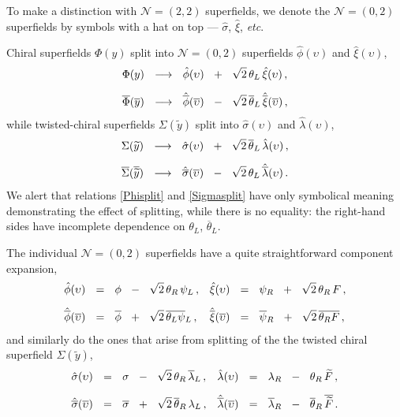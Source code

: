 \documentclass[epsfig,12pt]{article}
\newcommand{\ntwot}{${\mathcal N}= \left(2,2\right) $ }
\newcommand{\ntwoo}{${\mathcal N}= \left(0,2\right) $ }
\newcommand{\wt}{\widetilde}
\newcommand{\ov}{\overline}
\newcommand{\hphi}{\hat\phi{}}
\newcommand{\hbphi}{\hat{\ov\phi}{}}
\newcommand{\hxi}{\hat\xi{}}
\newcommand{\hbxi}{\hat{\ov\xi}{}}
\newcommand{\hsigma}{\hat\sigma{}}
\newcommand{\hbsigma}{\hat{\ov\sigma}{}}
\newcommand{\hlambda}{\hat\lambda{}}
\newcommand{\hblambda}{\hat{\ov\lambda}{}}
\begin{document}
	To make a distinction with \ntwot superfields, we denote the \ntwoo superfields
	by symbols with a hat on top --- $ \hsigma $, $ \hxi $, {\it etc}.

	Chiral superfields $ \Phi(y) $ split into \ntwoo superfields 
	$ \hphi(\upsilon) $ and $ \hxi(\upsilon) $,
\begin{align}
%
\notag
	\Phi(y) &    ~~\longrightarrow~~    \hphi(\upsilon)  ~~+~~  \sqrt{2}\,\theta_L\,\hxi(\upsilon)\,,
	\\[2mm]
%
\label{Phisplit}
	\ov\Phi(\ov y) &    ~~\longrightarrow~~    \hbphi(\ov\upsilon)  ~~-~~  \sqrt{2}\,\ov\theta{}_L\,\hbxi(\ov\upsilon)\,,
\end{align}
	while twisted-chiral superfields $ \Sigma(\wt y) $ split into 
	$ \hsigma(\upsilon) $ and $ \hlambda(\upsilon) $,
\begin{align}
%
\notag
	\Sigma(\wt y) &    ~~\longrightarrow~~    \hsigma(\upsilon)  ~~+~~  \sqrt{2}\,\ov\theta{}_L\,\hlambda(\upsilon)\,,
	\\[2mm]
%
\label{Sigmasplit}
	\ov\Sigma(\ov{\wt y}) &    ~~\longrightarrow~~    \hbsigma(\ov\upsilon)  ~~-~~  \sqrt{2}\,\theta_L\,\hblambda(\upsilon)\,.
\end{align}
	We alert that relations \eqref{Phisplit} and \eqref{Sigmasplit} have only symbolical meaning demonstrating
	the effect of splitting, while there is no equality:
	the right-hand sides have incomplete dependence on $ \theta_L $, $ \ov\theta{}_L $.

	The individual \ntwoo superfields have a quite straightforward component expansion,
\begin{align}
%
\notag
	\hphi(\upsilon) &    ~~=~~    \phi  ~~-~~  \sqrt{2}\,\theta_R\,\psi_L\,,
	&
	\hxi(\upsilon) &    ~~=~~    \psi_R  ~~+~~  \sqrt{2}\,\theta_R\,F\,,
	\\[2mm]
%
	\hbphi(\ov\upsilon) &    ~~=~~    \ov \phi  ~~+~~  \sqrt{2}\,\ov{\theta_L \psi}{}_L\,,
	&
	\hbxi(\ov\upsilon) &    ~~=~~    \ov\psi{}_R  ~~+~~  \sqrt{2}\,\ov{\theta_R F}\,,
\end{align}
	and similarly do the ones that arise from splitting of the the twisted chiral superfield $ \Sigma(\wt y) $, 
\begin{align}
%
\notag
	\hsigma(\upsilon) &    ~~=~~    \sigma  ~~-~~  \sqrt{2}\,\theta_R\,\ov\lambda{}_L\,,
	&
	\hlambda(\upsilon) &    ~~=~~    \lambda_R  ~~-~~  \theta_R\,\wt F\,,
	\\[2mm]
%
	\hbsigma(\ov\upsilon) &    ~~=~~    \ov\sigma  ~~+~~  \sqrt{2}\,\ov\theta{}_R\,\lambda_L\,,
	&
	\hblambda(\ov\upsilon) &    ~~=~~    \ov\lambda{}_R  ~~-~~  \ov\theta{}_R\,\ov{\wt F}\,.
\end{align}
\end{document}
